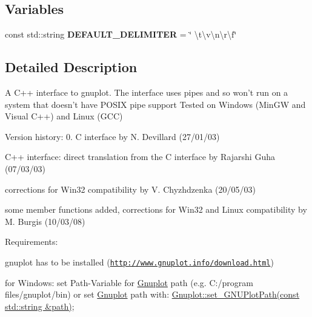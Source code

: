\subsection*{Variables}
\begin{DoxyCompactItemize}
\item 
\hypertarget{namespacekukadu_a627d5cc15a5c553b373f2e781bd4b338}{const std\-::string {\bfseries D\-E\-F\-A\-U\-L\-T\-\_\-\-D\-E\-L\-I\-M\-I\-T\-E\-R} = \char`\"{} \textbackslash{}t\textbackslash{}v\textbackslash{}n\textbackslash{}r\textbackslash{}f\char`\"{}}\label{namespacekukadu_a627d5cc15a5c553b373f2e781bd4b338}

\end{DoxyCompactItemize}


\subsection{Detailed Description}
A C++ interface to gnuplot. The interface uses pipes and so won't run on a system that doesn't have P\-O\-S\-I\-X pipe support Tested on Windows (Min\-G\-W and Visual C++) and Linux (G\-C\-C)

Version history\-: 0. C interface by N. Devillard (27/01/03)
\begin{DoxyEnumerate}
\item C++ interface\-: direct translation from the C interface by Rajarshi Guha (07/03/03)
\item corrections for Win32 compatibility by V. Chyzhdzenka (20/05/03)
\item some member functions added, corrections for Win32 and Linux compatibility by M. Burgis (10/03/08)
\end{DoxyEnumerate}

Requirements\-:
\begin{DoxyItemize}
\item gnuplot has to be installed (\href{http://www.gnuplot.info/download.html}{\tt http\-://www.\-gnuplot.\-info/download.\-html})
\item for Windows\-: set Path-\/\-Variable for \hyperlink{classkukadu_1_1Gnuplot}{Gnuplot} path (e.\-g. C\-:/program files/gnuplot/bin) or set \hyperlink{classkukadu_1_1Gnuplot}{Gnuplot} path with\-: \hyperlink{classkukadu_1_1Gnuplot_a04d7a36bbe70dcb878a1ae5d8299d012}{Gnuplot\-::set\-\_\-\-G\-N\-U\-Plot\-Path(const std\-::string \&path)}; 
\end{DoxyItemize}